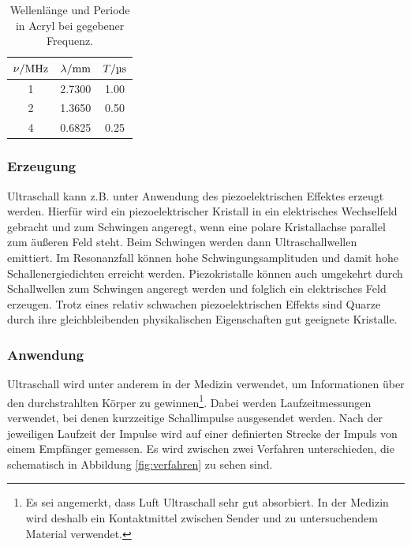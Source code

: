 \begin{table}[H]
    \centering
    \caption{Wellenlänge und Periode in Acryl bei gegebener Frequenz.}
    \label{tab:wellenlaenge-periode}
    \begin{tabular}{S[table-format=1.0] S[table-format=1.4] S[table-format=1.2]}
        \toprule
        {$\nu / \unit[]{\mega\hertz}$} & {$\lambda / \unit[]{\milli\meter}$} & {$T / \unit[]{\micro\second}$} \\
         & 2.7300 & 1.00 \\
        2 & 1.3650 & 0.50 \\
        4 & 0.6825 & 0.25 \\
        \bottomrule
    \end{tabular}
\end{table}
    

\subsubsection{Erzeugung}
Ultraschall kann z.B. unter Anwendung des piezoelektrischen Effektes erzeugt werden.
Hierfür wird ein piezoelektrischer Kristall in ein elektrisches Wechselfeld gebracht und zum Schwingen angeregt, 
wenn eine polare Kristallachse parallel zum äußeren Feld steht.
Beim Schwingen werden dann Ultraschallwellen emittiert.
Im Resonanzfall können hohe Schwingungsamplituden und damit hohe Schallenergiedichten erreicht werden.
Piezokristalle können auch umgekehrt durch Schallwellen zum Schwingen angeregt werden und folglich ein elektrisches Feld erzeugen.
Trotz eines relativ schwachen piezoelektrischen Effekts sind Quarze durch ihre gleichbleibenden physikalischen Eigenschaften
gut geeignete Kristalle.


\subsubsection{Anwendung}
Ultraschall wird unter anderem in der Medizin verwendet, um Informationen über den durchstrahlten Körper zu gewinnen\footnote[2]{Es 
sei angemerkt, dass Luft Ultraschall sehr gut absorbiert.
In der Medizin wird deshalb ein Kontaktmittel zwischen Sender und zu untersuchendem Material verwendet.}.
Dabei werden Laufzeitmessungen verwendet, bei denen kurzzeitige Schallimpulse ausgesendet werden.
Nach der jeweiligen Laufzeit der Impulse wird auf einer definierten Strecke der Impuls von einem Empfänger gemessen.
Es wird zwischen zwei Verfahren unterschieden, die schematisch in Abbildung \ref{fig:verfahren} zu sehen sind.

